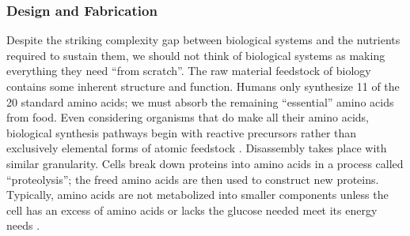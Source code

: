 {%
%
%
%

\subsubsection{Design and Fabrication}



Despite the striking complexity gap between biological systems and the nutrients required to sustain them, we should not think of biological systems as making everything they need ``from scratch''.  The raw material feedstock of biology contains some inherent structure and function.  Humans only synthesize 11 of the 20 standard amino acids; we must absorb the remaining ``essential'' amino acids from food.  Even considering organisms that do make all their amino acids, biological synthesis pathways begin with reactive precursors rather than exclusively elemental forms of atomic feedstock \cite{Stryer1988}.  Disassembly takes place with similar granularity.  Cells break down proteins into amino acids in a process called ``proteolysis''; the freed amino acids are then used to construct new proteins.  Typically, amino acids are not metabolized into smaller components unless the cell has an excess of amino acids or lacks the glucose needed meet its energy needs \cite{Stryer1988}.\\

}
